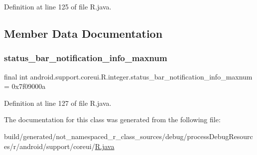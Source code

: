 Definition at line 125 of file R.\+java.


\begin{DoxyCode}{0}

\end{DoxyCode}


\subsection{Member Data Documentation}
\mbox{\label{classandroid_1_1support_1_1coreui_1_1_r_1_1integer_ae25c73a19ff7780a6f36e92aa4d65ea4}} 
\subsubsection{\texorpdfstring{status\_bar\_notification\_info\_maxnum}{status\_bar\_notification\_info\_maxnum}}
{\footnotesize\ttfamily final int android.\+support.\+coreui.\+R.\+integer.\+status\+\_\+bar\+\_\+notification\+\_\+info\+\_\+maxnum = 0x7f09000a\hspace{0.3cm}{\ttfamily [static]}}



Definition at line 127 of file R.\+java.



The documentation for this class was generated from the following file\+:\begin{DoxyCompactItemize}
\item 
build/generated/not\+\_\+namespaced\+\_\+r\+\_\+class\+\_\+sources/debug/process\+Debug\+Resources/r/android/support/coreui/\mbox{\hyperlink{android_2support_2coreui_2_r_8java}{R.\+java}}\end{DoxyCompactItemize}
